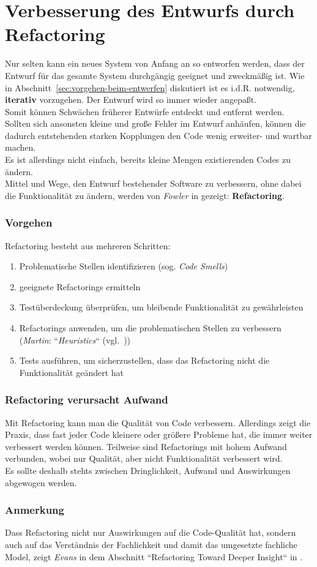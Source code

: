 \section{Verbesserung des Entwurfs durch Refactoring}
Nur selten kann ein neues System von Anfang an so entworfen werden, dass der Entwurf für das gesamte System  durchgängig geeignet und zweckmäßig ist.
Wie in Abschnitt~\ref{sec:vorgehen-beim-entwerfen} diskutiert ist es i.d.R. notwendig, \textbf{iterativ} vorzugehen.
Der Entwurf wird so immer wieder angepaßt.\\
Somit können Schwächen früherer Entwürfe entdeckt und entfernt werden.\\
Sollten sich ansonsten kleine und große Fehler im Entwurf anhäufen, können die dadurch entstehenden starken Kopplungen den Code wenig erweiter- und wartbar machen.\\

\noindent
Es ist allerdings nicht einfach, bereits kleine Mengen existierenden Codes zu ändern.\\
Mittel und Wege, den Entwurf bestehender Software zu verbessern, ohne dabei die Funktionalität zu ändern, werden von \textit{Fowler} in \cite{Fow99} gezeigt: \textbf{Refactoring}.

\subsubsection*{Vorgehen}
Refactoring besteht aus mehreren Schritten:

\begin{enumerate}
    \item Problematische Stellen identifizieren (sog. \textit{Code Smells})
    \item geeignete Refactorings ermitteln
    \item Testüberdeckung überprüfen, um bleibende Funktionalität zu gewährleisten
    \item Refactorings anwenden, um die problematischen Stellen zu verbessern (\textit{Martin}: ``\textit{Heuristics}`` (vgl.~\cite[285 ff.]{Mar08}))
    \item Tests ausführen, um sicherzustellen, dass das Refactoring nicht die Funktionalität geändert hat
\end{enumerate}

\subsubsection*{Refactoring verursacht Aufwand}
Mit Refactoring kann man die Qualität von Code verbessern.
Allerdings zeigt die Praxis, dass fast jeder Code kleinere oder größere Probleme hat, die immer weiter verbessert werden können.
Teilweise sind Refactorings mit hohem Aufwand verbunden, wobei nur Qualität, aber nicht Funktionalität verbessert wird.\\
Es sollte deshalb stehts zwischen Dringlichkeit, Aufwand und Auswirkungen abgewogen werden.

\subsubsection*{Anmerkung}
Dass Refactoring nicht nur Auswirkungen auf die Code-Qualität hat, sondern auch auf das Verständnis der Fachlichkeit und damit das umgesetzte fachliche Model, zeigt \textit{Evans} in dem Abschnitt ``Refactoring Toward Deeper Insight`` in \cite{Eva03}.